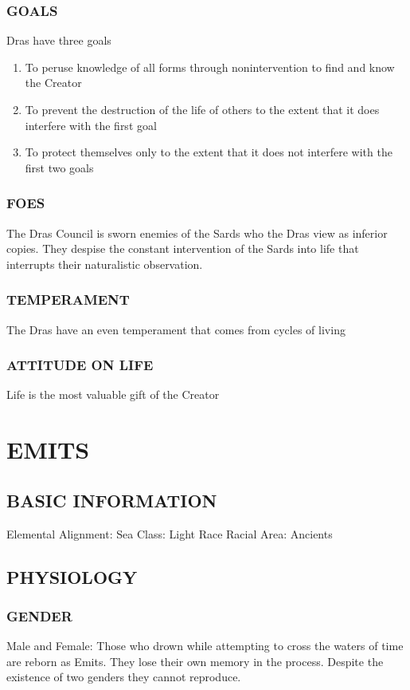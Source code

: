 \subsubsection{GOALS}
Dras have three goals
\begin{enumerate}
\item To peruse knowledge of all forms through nonintervention to find and know the Creator
\item To prevent the destruction of the life of others to the extent that it does interfere with the first goal
\item To protect themselves only to the extent that it does not interfere with the first two goals
\end{enumerate}
\subsubsection{FOES}
The Dras Council is sworn enemies of the Sards who the Dras view as inferior
copies.  They despise the constant intervention of the Sards into life that
interrupts their naturalistic observation.
\subsubsection{TEMPERAMENT}
The Dras have an even temperament that comes from cycles of living
\subsubsection{ATTITUDE ON LIFE}
Life is the most valuable gift of the Creator
\section{EMITS}
\subsection{BASIC INFORMATION}
Elemental Alignment: Sea
Class: Light Race
Racial Area: Ancients
\subsection{PHYSIOLOGY}
\subsubsection{GENDER }
Male and Female:  Those who drown while attempting to cross the waters of time
are reborn as Emits.  They lose their own memory in the process.  Despite the
existence of two genders they cannot reproduce.
